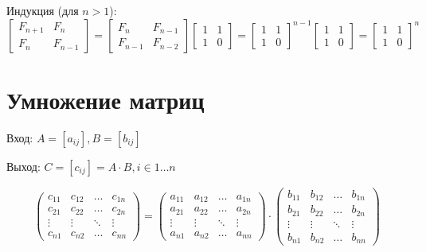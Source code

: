 \documentclass[a4paper,11pt]{article}
\begin{document}
Индукция (для $n > 1$):
\begin{equation*}
\begin{bmatrix}
  F_{n+1} & F_n \\
  F_n     & F_{n-1}
\end{bmatrix} =
\begin{bmatrix}
  F_n     & F_{n-1} \\
  F_{n-1} & F_{n-2}
\end{bmatrix}
\begin{bmatrix}
  1 & 1 \\
  1 & 0
\end{bmatrix} =
\begin{bmatrix}
  1 & 1 \\
  1 & 0
\end{bmatrix}^{n-1}
\begin{bmatrix}
  1 & 1 \\
  1 & 0
\end{bmatrix} =
\begin{bmatrix}
  1 & 1 \\
  1 & 0
\end{bmatrix}^n
\end{equation*}

\section{Умножение матриц}
Вход: $A = [a_{ij}], B = [b_{ij}]$

Выход: $C = [c_{ij}] = A \cdot B, i \in 1 \ldots n$

\begin{equation*}
\begin{pmatrix}
c_{11} & c_{12} & \ldots & c_{1n} \\
c_{21} & c_{22} & \ldots & c_{2n} \\
\vdots & \vdots & \ddots & \vdots \\
c_{n1} & c_{n2} & \ldots & c_{nn}
\end{pmatrix}
=
\begin{pmatrix}
a_{11} & a_{12} & \ldots & a_{1n} \\
a_{21} & a_{22} & \ldots & a_{2n} \\
\vdots & \vdots & \ddots & \vdots \\
a_{n1} & a_{n2} & \ldots & a_{nn}
\end{pmatrix}
\cdot
\begin{pmatrix}
b_{11} & b_{12} & \ldots & b_{1n} \\
b_{21} & b_{22} & \ldots & b_{2n} \\
\vdots & \vdots & \ddots & \vdots \\
b_{n1} & b_{n2} & \ldots & b_{nn}
\end{pmatrix}
\end{equation*}
\end{document}
